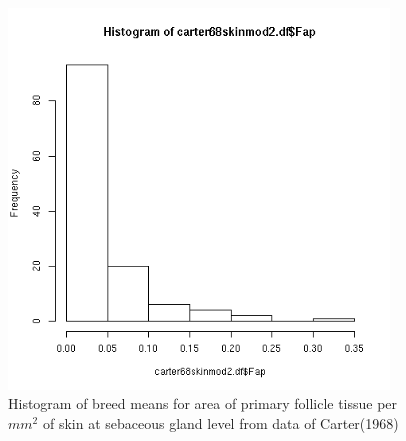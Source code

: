 %

\begin{figure}[!h]
  \centering
   \includegraphics[width=0.9\textwidth]{faphist.png}
  \caption{Histogram of breed means for area of primary follicle tissue per $mm^{2}$ of skin at sebaceous gland level from data of Carter(1968)~\cite{cart:68}}
  \label{fig:faphist}
\end{figure}

%


